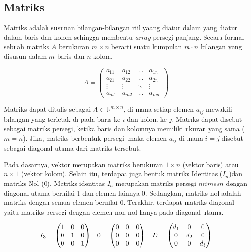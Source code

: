 \subsection{Matriks}
Matriks adalah susunan bilangan-bilangan riil yaang diatur dalam yang diatur dalam baris dan kolom sehingga membentu \textit{array} persegi panjang. Secara formal sebuah matriks $A$ berukuran $m\times n$ berarti suatu kumpulan $m \cdot n$ bilangan yang disusun dalam $m$ baris dan $n$ kolom. 

$$
A = \begin{pmatrix}
a_{11} & a_{12} & \dots & a_{1n} \\
a_{21} & a_{22} & \dots & a_{2n} \\
\vdots & \vdots & \ddots & \vdots \\
a_{m1} & a_{m2} & \dots & a_{mn}
\end{pmatrix}
$$

Matriks dapat ditulis sebagai $A \in \mathbb{R}^{m \times n}$, di mana setiap elemen $a_{ij}$ mewakili bilangan yang terletak di pada baris ke-$i$ dan kolom ke-$j$. Matriks dapat disebut sebagai matriks persegi, ketika baris dan kolomnya memiliki ukuran yang sama ($m = n$). Jika, matriks berbentuk persegi, maka elemen $a_{ij}$ di mana $i = j$ disebut sebagai diagonal utama dari matriks tersebut.

Pada dasarnya, vektor merupakan matriks berukuran $1 \times n$ (vektor baris) atau $n \times 1$ (vektor kolom). Selain itu, terdapat juga bentuk matriks Identitas ($I_n$)dan matriks Nol ($0$). Matriks identitas $I_n$ merupakan matriks persegi $n 
times n$ dengan diagonal utama bernilai 1 dan elemen lainnya 0. Sedangkan, matriks nol adalah matriks dengan semua elemen bernilai 0. Terakhir, terdapat matriks diagonal, yaitu matriks persegi dengan elemen non-nol hanya pada diagonal utama. 

$$
I_3 = 
\begin{pmatrix}
1 & 0 & 0 \\
0 & 1 & 0 \\
0 & 0 & 1 \\
\end{pmatrix}
\hspace{0.3cm}
0 = \begin{pmatrix}
    0   & 0     & 0 \\
    0   & 0     & 0 \\
    0   & 0     & 0 \\
\end{pmatrix}
\hspace{0.3cm}
D = \begin{pmatrix}
    d_1 & 0     & 0 \\
    0   & d_2   & 0 \\
    0   & 0     & d_3 \\
\end{pmatrix}
$$

